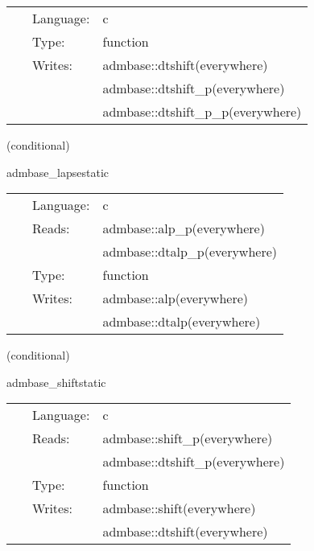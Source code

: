\documentclass{article}
\begin{document}
 \begin{tabular*}{160mm}{cll} 
~ & Language:  & c \\ 
~ & Type:  & function \\ 
~ & Writes:  & admbase::dtshift(everywhere) \\ 
~& ~ &admbase::dtshift\_p(everywhere)\\ 
~& ~ &admbase::dtshift\_p\_p(everywhere)\\ 
\end{tabular*} 


\vspace{5mm}

   (conditional) 

\hspace{5mm} admbase\_lapsestatic 

\hspace{5mm}{\it copy the lapse to the current time level } 


\hspace{5mm}

 \begin{tabular*}{160mm}{cll} 
~ & Language:  & c \\ 
~ & Reads:  & admbase::alp\_p(everywhere) \\ 
~& ~ &admbase::dtalp\_p(everywhere)\\ 
~ & Type:  & function \\ 
~ & Writes:  & admbase::alp(everywhere) \\ 
~& ~ &admbase::dtalp(everywhere)\\ 
\end{tabular*} 


\vspace{5mm}

   (conditional) 

\hspace{5mm} admbase\_shiftstatic 

\hspace{5mm}{\it copy the shift to the current time level } 


\hspace{5mm}

 \begin{tabular*}{160mm}{cll} 
~ & Language:  & c \\ 
~ & Reads:  & admbase::shift\_p(everywhere) \\ 
~& ~ &admbase::dtshift\_p(everywhere)\\ 
~ & Type:  & function \\ 
~ & Writes:  & admbase::shift(everywhere) \\ 
~& ~ &admbase::dtshift(everywhere)\\ 
\end{tabular*} 
\end{document}
